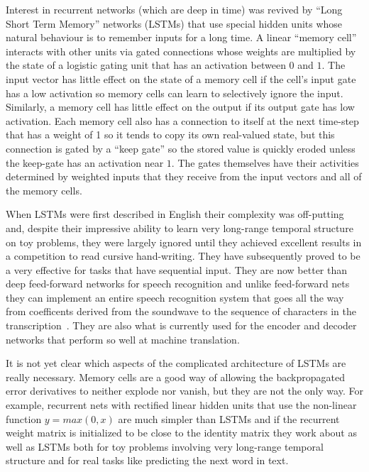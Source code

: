 \documentclass[]{article}
\begin{document}
Interest in recurrent networks (which are deep in time) was revived by ``Long Short Term Memory'' networks (LSTMs) that
use special hidden units whose natural behaviour is to remember inputs for a long time\cite{Hochreiter}.  A
linear ``memory cell'' interacts with other units via gated connections whose weights are multiplied by the state of a
logistic gating unit that has an activation between $0$ and $1$. The input vector has little effect on the state of a
memory cell if the cell's input gate has a low activation so memory cells can learn to selectively ignore the input.  Similarly,
a memory cell has little effect on the output if its output gate has low activation. Each memory cell also has a
connection to itself at the next time-step that has a weight of 1 so it tends to copy its own real-valued state, but
this connection is gated by a ``keep gate'' so the stored value is quickly eroded unless the keep-gate has an activation
near $1$.  The gates themselves have their activities determined by weighted inputs that they receive from the input
vectors and all of the memory cells.

When LSTMs were first described in English\cite{HochSchmid} their complexity was off-putting and, despite their
impressive ability to learn very long-range temporal structure on toy problems, they were largely ignored until they
achieved excellent results in a competition to read cursive hand-writing\cite{Graves}. They have subsequently proved to
be a very effective for tasks that have sequential input.  They are now better than deep feed-forward networks for
speech recognition\cite{gravestimit} and unlike feed-forward nets they can implement an entire speech recognition system
that goes all the way from coefficents derived from the soundwave to the sequence of characters in the transcription~\cite{graves}.
They are also what is currently used for the encoder and decoder networks that perform so well at machine translation.

It is not yet clear which aspects of the complicated architecture of LSTMs are really necessary. Memory cells are a good
way of allowing the backpropagated error derivatives to neither explode nor vanish, but they are not the only way.  For
example, recurrent nets with rectified linear hidden units that use the non-linear function $y=max(0,x)$ are much
simpler than LSTMs and if the recurrent weight matrix is initialized to be close to the identity matrix they work about
as well as LSTMs both for toy problems involving very long-range temporal structure and for real tasks like predicting
the next word in text\cite{LeHinton}.
\end{document}
